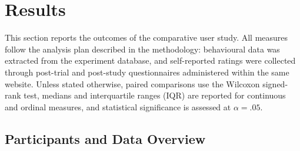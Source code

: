 \pagestyle{fancy}
\section{Results}



This section reports the outcomes of the comparative user study. All measures follow the analysis plan described in the methodology: behavioural data was extracted from the experiment database, and self-reported ratings were collected through post-trial and post-study questionnaires administered within the same website. Unless stated otherwise, paired comparisons use the Wilcoxon signed-rank test, medians and interquartile ranges (IQR) are reported for continuous and ordinal measures, and statistical significance is assessed at $\alpha = .05$.

\subsection{Participants and Data Overview}

%
%

